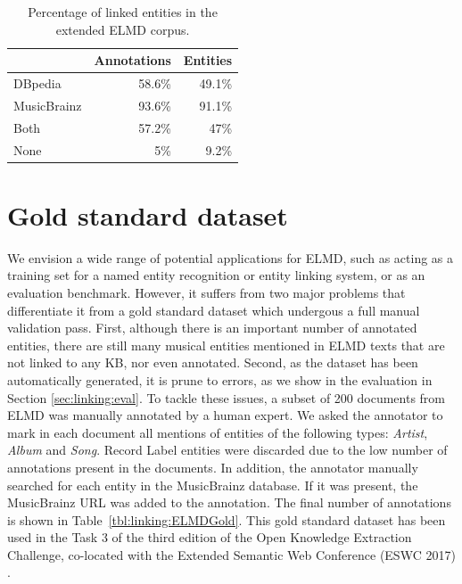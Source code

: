 \begin{table}[]
\centering
\begin{tabular}{ l r r }
\hline
& \textbf{Annotations} & \textbf{Entities} \\ \hline
DBpedia    & 58.6\%      & 49.1\%    \\ 
MusicBrainz & 93.6\%      & 91.1\%    \\
Both  & 57.2\%       & 47\%    \\ 
None & 5\%	& 9.2\% \\ \hline
\end{tabular}
\caption{Percentage of linked entities in the extended ELMD corpus.}
\label{tbl:linking:elmd2_percentage}
\end{table}


\section{Gold standard dataset}
\label{sec:linking:gold}

We envision a wide range of potential applications for \textsc{ELMD}, such as acting as a training set for a named entity recognition or entity linking system, or as an evaluation benchmark. However, it suffers from two major problems that differentiate it from a gold standard dataset which undergous a full manual validation pass. First, although there is an important number of annotated entities, there are still many musical entities mentioned in \textsc{ELMD} texts that are not linked to any KB, nor even annotated. Second, as the dataset has been automatically generated, it is prune to errors, as we show in the evaluation in Section \ref{sec:linking:eval}. To tackle these issues, a subset of 200 documents from \textsc{ELMD} was manually annotated by a human expert. We asked the annotator to mark in each document all mentions of entities of the following types: \textit{Artist}, \textit{Album} and \textit{Song}. Record Label entities were discarded due to the low number of annotations present in the documents. In addition, the annotator manually searched for each entity in the MusicBrainz database. If it was present, the MusicBrainz URL was added to the annotation. The final number of annotations is shown in Table~\ref{tbl:linking:ELMDGold}.
This gold standard dataset has been used in the Task 3 of the third edition of the Open Knowledge Extraction Challenge, co-located with the Extended Semantic Web Conference (ESWC 2017) \citep{}.

